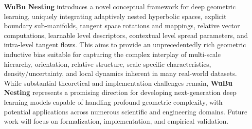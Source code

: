 \documentclass[11pt, twoside]{article} %
\newcommand{\wubu}{\textbf{WuBu Nesting}} %
\begin{document}
\wubu{} introduces a novel conceptual framework for deep geometric learning, uniquely integrating adaptively nested hyperbolic spaces, explicit boundary sub-manifolds, tangent space rotations and mappings, relative vector computations, learnable level descriptors, contextual level spread parameters, and intra-level tangent flows. This aims to provide an unprecedentedly rich geometric inductive bias suitable for capturing the complex interplay of multi-scale hierarchy, orientation, relative structure, scale-specific characteristics, density/uncertainty, and local dynamics inherent in many real-world datasets. While substantial theoretical and implementation challenges remain, \wubu{} represents a promising direction for developing next-generation deep learning models capable of handling profound geometric complexity, with potential applications across numerous scientific and engineering domains. Future work will focus on formalization, implementation, and empirical validation.

\end{document}
